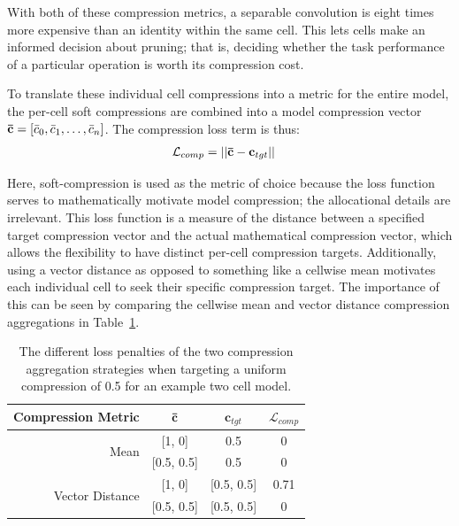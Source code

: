 \noindent With both of these compression metrics, a separable convolution is eight times more expensive than an identity within
the same cell. This lets cells make an informed decision about pruning; that is, deciding whether the task performance
of a particular operation is worth its compression cost.

To translate these individual cell compressions into a metric for the entire model, the per-cell soft
compressions are combined into a model compression vector $\mathbf{\bar{c}}=[\bar{c}_0, \bar{c}_1, \dots, \bar{c}_n]$. The compression loss term is thus:
\begin{align}
	\mathcal{L}_{comp} &=  ||\mathbf{\bar{c}} - \mathbf{c}_{tgt}|| \label{eq:comp_term_vector}
\end{align}

\noindent Here, soft-compression is used as the metric of choice because the loss function serves to mathematically
motivate model compression; the allocational details are irrelevant. This loss function is a measure of the distance
between a specified target compression vector and the actual mathematical compression
vector, which allows the flexibility to have distinct per-cell compression targets. Additionally, using a vector distance
as opposed to something like a cellwise mean motivates each individual cell to seek their specific compression
target. The importance of this can be seen by comparing the cellwise mean and vector distance compression aggregations in
Table~\ref{tab:compmetrics}.

\begin{table}[h]
\begin{center}
\begin{tabular}{r|c|c|c}
Compression Metric & $\mathbf{\bar{c}}$ & $\mathbf{c}_{tgt}$ & $\mathcal{L}_{comp}$ \\
\hline
\multirow{2}{*}{Mean}	& [1, 0] 		& 0.5 	& 0 \\
					  	& [0.5, 0.5] 	& 0.5   & 0 \\
\hline
\multirow{2}{*}{Vector Distance} & [1, 0] 		& [0.5, 0.5] & 0.71 \\
								 & [0.5, 0.5] 	& [0.5, 0.5] & 0 \\
\end{tabular}
\end{center}
\caption[Various loss penalties of different compression aggregation strategies]{The different loss penalties of the two compression aggregation strategies when targeting a uniform compression of 0.5
for an example two cell model.}
\label{tab:compmetrics}
\end{table}

